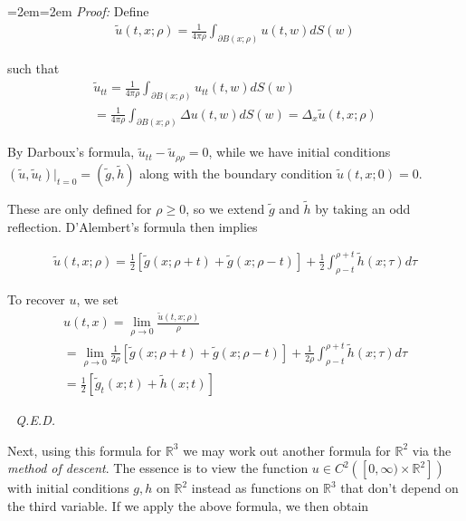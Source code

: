 \documentclass{article}
\newcommand{\R}{{\mathbb{R}}}
\newcommand{\pd}{\partial}
\newenvironment{pf}{%
	\par%
	\medskip
	\leftskip=2em\rightskip=2em%
	\noindent\ignorespaces \textit{Proof:} \newline}{%
	\,\, \newline \textit{Q.E.D.}\par\medskip}
\begin{document}
	
	\begin{pf}
		Define
		\begin{align*}
			\tilde{u}(t,x;\rho) = \frac{1}{4 \pi \rho} \int_{\pd B(x;\rho)} u(t,w) dS(w)
		\end{align*}
		
		such that 
		\begin{align*}
			\tilde{u}_{tt} = \frac{1}{4 \pi \rho} \int_{\pd B(x;\rho)} u_{tt}(t,w) dS(w) \\
			= \frac{1}{4 \pi \rho} \int_{\pd B(x;\rho)} \Delta u(t,w) dS(w) = \Delta_{x} \tilde{u}(t,x;\rho)
		\end{align*}
		
		By Darboux's formula, $ \tilde{u}_{tt} - \tilde{u}_{\rho \rho} = 0$, while we have initial conditions $(\tilde{u}, \tilde{u}_{t})|_{t = 0} = (\tilde{g}, \tilde{h})$ along with the boundary condition $\tilde{u}(t,x;0) = 0$. 
		
		These are only defined for $\rho \geq 0$, so we extend $\tilde{g}$ and $\tilde{h}$ by taking an odd reflection. D'Alembert's formula then implies
		
		\begin{align*}
			\tilde{u}(t,x;\rho) = \frac{1}{2}\left[ \tilde{g}(x;\rho + t) + \tilde{g}(x;\rho - t)\right] + \frac{1}{2} \int_{\rho - t}^{\rho + t} \tilde{h}(x;\tau)d\tau
		\end{align*}
		
		To recover $u$, we set
		\begin{align*}
			u(t,x) = \lim_{\rho \to 0} \frac{\tilde{u}(t,x;\rho)}{\rho} \\
			= \lim_{\rho \to 0}\frac{1}{2 \rho}\left[ \tilde{g}(x;\rho + t) + \tilde{g}(x;\rho - t)\right] + \frac{1}{2 \rho} \int_{\rho - t}^{\rho + t} \tilde{h}(x;\tau)d\tau \\
			= \frac{1}{2} \left[\tilde{g}_{t}(x;t) + \tilde{h}(x;t) \right]
		\end{align*}
		
		
	\end{pf}

	
	Next, using this formula for $\R^{3}$ we may work out another formula for $\R^{2}$ via the \textit{method of descent}. The essence is to view the function $u \in C^{2}([0,\infty)\times \R^{2}])$ with initial conditions $g,h$ on $\R^{2}$ instead as functions on $\R^{3}$ that don't depend on the third variable. If we apply the above formula, we then obtain
	
\end{document}
